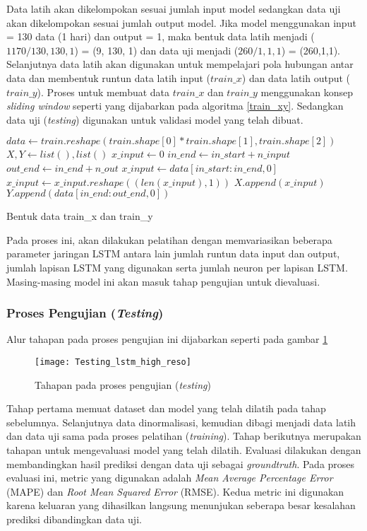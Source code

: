 \documentclass[../thesis.tex]{subfiles}
\begin{document}
Data latih akan dikelompokan sesuai jumlah input model sedangkan data uji akan dikelompokan sesuai jumlah output model. Jika model menggunakan input = 130 data (1 hari) dan output = 1, maka bentuk data latih menjadi ($1170/130, 130, 1$) = (9, 130, 1) dan data uji menjadi ($260/1, 1, 1$) = (260,1,1).
Selanjutnya data latih akan digunakan untuk mempelajari pola hubungan antar data dan membentuk runtun data latih input ($train\_x$) dan data latih output ($train\_y$). Proses untuk membuat data $train\_x$ dan $train\_y$ menggunakan konsep \textit{sliding window} seperti yang dijabarkan pada algoritma \ref{train_xy}. Sedangkan data uji (\textit{testing}) digunakan untuk validasi model yang telah dibuat.
\begin{algorithm}[htp]
	\begin{algorithmic}[1]
		\State $data \leftarrow train.reshape(train.shape[0]*train.shape[1], train.shape[2])$
		\State $X, Y \leftarrow list(), list()$
		\State $x\_input \leftarrow 0$
			\State $in\_end \leftarrow in\_start + n\_input$
			\State $out\_end \leftarrow in\_end + n\_out$
				\State $x\_input \leftarrow data[in\_start: in\_end, 0]$
				\State $x\_input \leftarrow x\_input.reshape((len(x\_input), 1))$
				\State $X.append(x\_input)$
				\State $Y.append(data[in\_end:out\_end, 0])$
			\EndIf
		\EndFor
	\EndFunction
	\end{algorithmic}
	\caption{Bentuk data train_x dan train_y}
	\label{train_xy}
\end{algorithm}
	
Pada proses ini, akan dilakukan pelatihan dengan memvariasikan beberapa parameter jaringan LSTM antara lain jumlah runtun data input dan output, jumlah lapisan LSTM yang digunakan serta jumlah neuron per lapisan LSTM. 
Masing-masing model ini akan masuk tahap pengujian untuk dievaluasi.

\subsubsection{Proses Pengujian (\textit{Testing})}
Alur tahapan pada proses pengujian ini dijabarkan seperti pada gambar \ref{lstm_testing}
\begin{figure}[t]
	\centering
	\texttt{[image: Testing\_lstm\_high\_reso]}
	\caption{Tahapan pada proses pengujian (\textit{testing})}
	\label{lstm_testing}
\end{figure}
Tahap pertama memuat dataset dan model yang telah dilatih pada tahap sebelumnya. Selanjutnya data dinormalisasi, kemudian dibagi menjadi data latih dan data uji sama pada proses pelatihan (\textit{training}).
Tahap berikutnya merupakan tahapan untuk mengevaluasi model yang telah dilatih. Evaluasi dilakukan dengan membandingkan hasil prediksi dengan data uji sebagai \textit{groundtruth}. Pada proses evaluasi ini, metric yang digunakan adalah \textit{Mean Average Percentage Error} (MAPE) dan \textit{Root Mean Squared Error} (RMSE). Kedua metric ini digunakan karena keluaran yang dihasilkan langsung menunjukan seberapa besar kesalahan prediksi dibandingkan data uji. 
\end{document}
